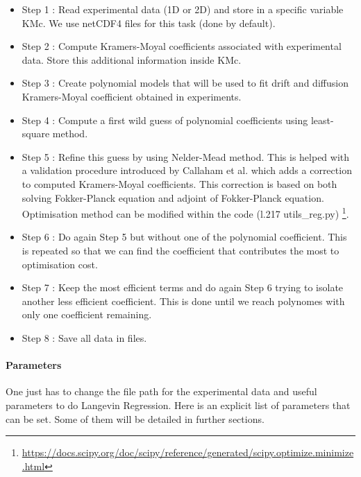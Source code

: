 \documentclass[A4paper]{article}
\begin{document}
\begin{itemize}
\item Step 1 : Read experimental data (1D or 2D) and store in a specific variable KMc. We use netCDF4 files for this task (done by default).

\item Step 2 : Compute Kramers-Moyal coefficients associated with experimental data. Store this additional information inside KMc.

\item Step 3 : Create polynomial models that will be used to fit drift and diffusion Kramers-Moyal coefficient obtained in experiments.

\item Step 4 : Compute a first wild guess of polynomial coefficients using least-square method.

\item Step 5 : Refine this guess by using Nelder-Mead method. This is helped with a validation procedure introduced by Callaham et al. which adds a correction to computed Kramers-Moyal coefficients. This correction is based on both solving Fokker-Planck equation and adjoint of Fokker-Planck equation. Optimisation method can be modified within the code (l.217 utils\_reg.py) \footnote{\url{https://docs.scipy.org/doc/scipy/reference/generated/scipy.optimize.minimize.html}}.

\item Step 6 : Do again Step 5 but without one of the polynomial coefficient. This is repeated so that we can find the coefficient that contributes the most to optimisation cost.

\item Step 7 : Keep the most efficient terms and do again Step 6 trying to isolate another less efficient coefficient. This is done until we reach polynomes with only one coefficient remaining.

\item Step 8 : Save all data in files.
\end{itemize}

\paragraph{Parameters}
One just has to change the file path for the experimental data and useful parameters to do Langevin Regression. Here is an explicit list of parameters that can be set. Some of them will be detailed in further sections.
\end{document}
